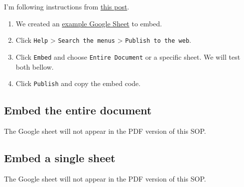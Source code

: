 \documentclass[
  letterpaper,
  DIV=11,
  numbers=noendperiod]{scrreprt}
\begin{document}
I'm following instructions from
\href{https://support.google.com/docs/thread/212358523/embedding-a-table-from-sheets-to-a-website?hl=en}{this
post}.

\begin{enumerate}
\def\labelenumi{\arabic{enumi}.}
\item
  We created an
  \href{https://docs.google.com/spreadsheets/d/1RVgT28QJ6dV5kCSzS9BEOVMooiy06DEhv2d-eqxIjZY/edit?gid=0\#gid=0}{example
  Google Sheet} to embed.
\item
  Click \texttt{Help} \textgreater{} \texttt{Search\ the\ menus}
  \textgreater{} \texttt{Publish\ to\ the\ web}.
\item
  Click \texttt{Embed} and choose \texttt{Entire\ Document} or a
  specific sheet. We will test both bellow.
\item
  Click \texttt{Publish} and copy the embed code.
\end{enumerate}

\subsection{Embed the entire document}\label{embed-the-entire-document}

\begin{tcolorbox}[enhanced jigsaw, breakable, title=\textcolor{quarto-callout-note-color}{\faInfo}\hspace{0.5em}{Note}, bottomrule=.15mm, coltitle=black, left=2mm, colbacktitle=quarto-callout-note-color!10!white, colback=white, toprule=.15mm, leftrule=.75mm, arc=.35mm, colframe=quarto-callout-note-color-frame, bottomtitle=1mm, toptitle=1mm, opacityback=0, titlerule=0mm, opacitybacktitle=0.6, rightrule=.15mm]

The Google sheet will not appear in the PDF version of this SOP.

\end{tcolorbox}

\subsection{Embed a single sheet}\label{embed-a-single-sheet}

\begin{tcolorbox}[enhanced jigsaw, breakable, title=\textcolor{quarto-callout-note-color}{\faInfo}\hspace{0.5em}{Note}, bottomrule=.15mm, coltitle=black, left=2mm, colbacktitle=quarto-callout-note-color!10!white, colback=white, toprule=.15mm, leftrule=.75mm, arc=.35mm, colframe=quarto-callout-note-color-frame, bottomtitle=1mm, toptitle=1mm, opacityback=0, titlerule=0mm, opacitybacktitle=0.6, rightrule=.15mm]

The Google sheet will not appear in the PDF version of this SOP.

\end{tcolorbox}
\end{document}
